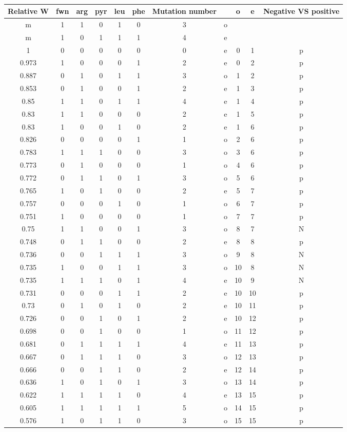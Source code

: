 \begin{table}[ht]
\begin{tabular}{ccccccccccc}
\hline
Relative W	&fwn	&arg	&pyr	&leu	&phe	&Mutation number	&	&o	&e	&Negative VS positive\\
\hline
m&	1&	1&	0&	1&	0&	3&	o&	&	&	\\
m&	1&	0&	1&	1&	1&	4&	e&	&	&	\\
1&	0&	0&	0&	0&	0&	0&	e&	0&	1&	p\\
0.973&	1&	0&	0&	0&	1&	2&	e&	0&	2&	p\\
0.887&	0&	1&	0&	1&	1&	3&	o&	1&	2&	p\\
0.853&	0&	1&	0&	0&	1&	2&	e&	1&	3&	p\\
0.85&	1&	1&	0&	1&	1&	4&	e&	1&	4&	p\\
0.83&	1&	1&	0&	0&	0&	2&	e&	1&	5&	p\\
0.83&	1&	0&	0&	1&	0&	2&	e&	1&	6&	p\\
0.826&	0&	0&	0&	0&	1&	1&	o&	2&	6&	p\\
0.783&	1&	1&	1&	0&	0&	3&	o&	3&	6&	p\\
0.773&	0&	1&	0&	0&	0&	1&	o&	4&	6&	p\\
0.772&	0&	1&	1&	0&	1&	3&	o&	5&	6&	p\\
0.765&	1&	0&	1&	0&	0&	2&	e&	5&	7&	p\\
0.757&	0&	0&	0&	1&	0&	1&	o&	6&	7&	p\\
0.751&	1&	0&	0&	0&	0&	1&	o&	7&	7&	p\\
0.75&	1&	1&	0&	0&	1&	3&	o&	8&	7&	N\\
0.748&	0&	1&	1&	0&	0&	2&	e&	8&	8&	p\\
0.736&	0&	0&	1&	1&	1&	3&	o&	9&	8&	N\\
0.735&	1&	0&	0&	1&	1&	3&	o&	10&	8&	N\\
0.735&	1&	1&	1&	0&	1&	4&	e&	10&	9&	N\\
0.731&	0&	0&	0&	1&	1&	2&	e&	10&	10&	p\\
0.73&	0&	1&	0&	1&	0&	2&	e&	10&	11&	p\\
0.726&	0&	0&	1&	0&	1&	2&	e&	10&	12&	p\\
0.698&	0&	0&	1&	0&	0&	1&	o&	11&	12&	p\\
0.681&	0&	1&	1&	1&	1&	4&	e&	11&	13&	p\\
0.667&	0&	1&	1&	1&	0&	3&	o&	12&	13&	p\\
0.666&	0&	0&	1&	1&	0&	2&	e&	12&	14&	p\\
0.636&	1&	0&	1&	0&	1&	3&	o&	13&	14&	p\\
0.622&	1&	1&	1&	1&	0&	4&	e&	13&	15&	p\\
0.605&	1&	1&	1&	1&	1&	5&	o&	14&	15&	p\\
0.576&	1&	0&	1&	1&	0&	3&	o&	15&	15&	p\\
\hline
\end{tabular}
\medskip
{}
\caption{
}
\label{tab:circuit_interactions}
\end{table}
